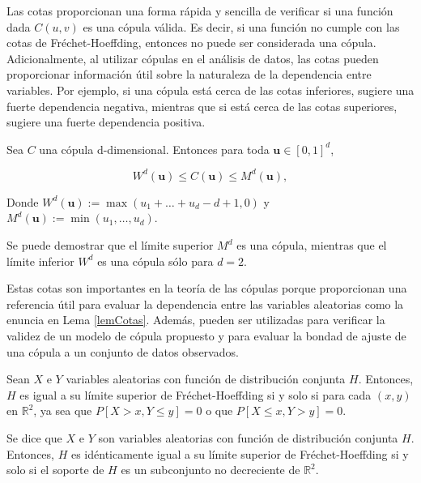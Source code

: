 Las cotas proporcionan una forma rápida y sencilla de verificar si una función dada $C(u, v)$  es una cópula válida. Es decir, si una función no cumple con las cotas de Fréchet-Hoeffding, entonces no puede ser considerada una cópula. Adicionalmente, al utilizar cópulas en el análisis de datos, las cotas pueden proporcionar información útil sobre la naturaleza de la dependencia entre variables. Por ejemplo, si una cópula está cerca de las cotas inferiores, sugiere una fuerte dependencia negativa, mientras que si está cerca de las cotas superiores, sugiere una fuerte dependencia positiva.

\begin{defn}
    Sea $C$ una cópula d-dimensional. Entonces para toda $\boldsymbol{u} \in[0,1]^d$,

    \begin{equation}
        W^d(\boldsymbol{u}) \leq C(\boldsymbol{u}) \leq M^d(\boldsymbol{u}),
    \end{equation}

Donde $W^d(\boldsymbol{u}):= \max \left(u_1+\ldots+u_d-d+1,0\right)$ y $M^d(\boldsymbol{u}):=\min \left(u_1, \ldots, u_d\right)$.
\end{defn}

Se puede demostrar que el límite superior $M^d$ es una cópula, mientras que el límite inferior $W^d$ es una cópula sólo para $d = 2$.

Estas cotas son importantes en la teoría de las cópulas porque proporcionan una referencia útil para evaluar la dependencia entre las variables aleatorias como la enuncia en Lema \ref{lemCotas}. Además, pueden ser utilizadas para verificar la validez de un modelo de cópula propuesto y para evaluar la bondad de ajuste de una cópula a un conjunto de datos observados.

\begin{lema}\label{lemCotas}
    Sean $X$ e $Y$ variables aleatorias con función de distribución conjunta $H$. Entonces, $H$ es igual a su límite superior de Fréchet-Hoeffding si y solo si para cada $(x, y)$ en $\mathbb{R}^2$, ya sea que $P[X > x, Y \leq y] = 0$ o que $P[X \leq x, Y > y] = 0$.
\end{lema}

\begin{teor}
    Se dice que $X$ e $Y$ son variables aleatorias con función de distribución conjunta $H$. Entonces, $H$ es idénticamente igual a su límite superior de Fréchet-Hoeffding si y solo si el soporte de $H$ es un subconjunto no decreciente de $\mathbb{R}^2$.
\end{teor}

